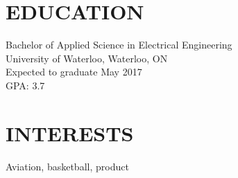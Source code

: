 \documentclass[line, margin, 11pt]{res}
\begin{document}
\begin{resume}
\section{EDUCATION}
 Bachelor of Applied Science in Electrical Engineering 	 \\
 University of Waterloo, Waterloo, ON \\
 Expected to graduate May 2017 \\
 GPA: 3.7

\section{INTERESTS} 
Aviation, basketball, product 



\end{resume}
\end{document}
